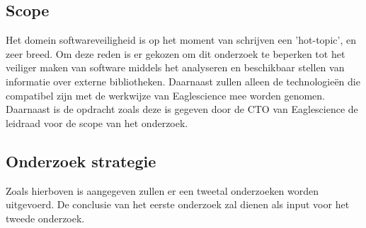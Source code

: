 \subsection{Scope}\label{subsec:scope}
Het domein softwareveiligheid is op het moment van schrijven een 'hot-topic', en zeer breed. Om deze reden is er gekozen om dit onderzoek te beperken tot het veiliger maken van software middels het analyseren en beschikbaar stellen van informatie over externe bibliotheken. Daarnaast zullen alleen de technologieën die compatibel zijn met de werkwijze van Eaglescience mee worden genomen. Daarnaast is de opdracht zoals deze is gegeven door de CTO van Eaglescience de leidraad voor de scope van het onderzoek.

\subsection{Onderzoek strategie}\label{subsec:onderzoek-strategie}
Zoals hierboven is aangegeven zullen er een tweetal onderzoeken worden uitgevoerd. De conclusie van het eerste onderzoek zal dienen als input voor het tweede onderzoek.



